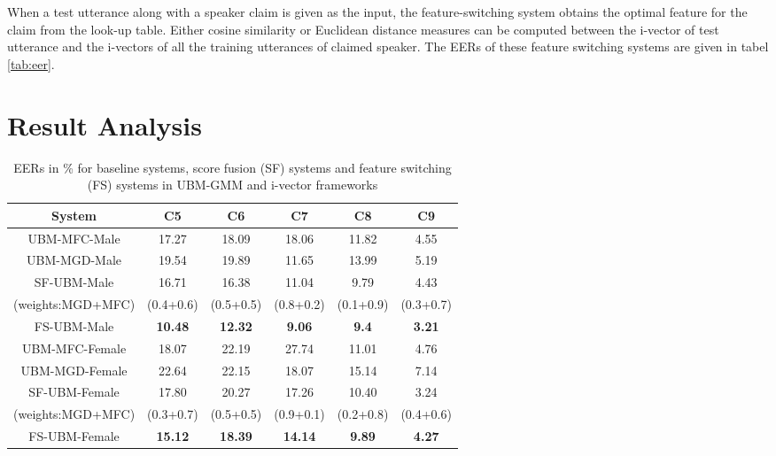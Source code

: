 \documentclass{article}
\begin{document}
\vspace{0.25 cm}
When a test utterance along with a speaker claim is given as the input, the feature-switching system obtains the optimal feature for the claim from the look-up table. Either cosine similarity or Euclidean distance measures can be computed between the i-vector of test utterance and the i-vectors of all the training utterances of claimed speaker. The EERs of these feature switching systems are given in tabel \ref{tab:eer}.

\section{Result Analysis}
\label{sec:resAnalysis}

\begin{table}[h]
	\centering
	\caption{EERs in \% for baseline systems, score fusion (SF) systems and feature switching (FS) systems in UBM-GMM and i-vector frameworks}
	\begin{tabular}{|c|c|c|c|c|c|} \hline
 {\bf System} & {\bf C5 } &  {\bf C6} & {\bf C7} & {\bf C8}  & {\bf C9  }\\ \hline \hline

UBM-MFC-Male & 17.27 & 18.09 & 18.06 & 11.82 & 4.55 \\ \hline

UBM-MGD-Male & 19.54 & 19.89 & 11.65 & 13.99 & 5.19 \\ \hline

SF-UBM-Male & 16.71 & 16.38 & 11.04 & 9.79 & 4.43 \\ 
(weights:MGD+MFC) & (0.4+0.6) & (0.5+0.5) & (0.8+0.2) & (0.1+0.9) & (0.3+0.7) \\ \hline

{FS-UBM-Male} & {\bf 10.48} & {\bf 12.32} & {\bf 9.06} & {\bf 9.4} & {\bf 3.21} \\  \hline

{UBM-MFC-Female} & 18.07 & 22.19 & 27.74 & 11.01 & 4.76 \\ \hline

{UBM-MGD-Female} & 22.64 & 22.15 & 18.07 & 15.14 & 7.14 \\ \hline

SF-UBM-Female & 17.80 & 20.27 & 17.26 & 10.40 & 3.24 \\ 
(weights:MGD+MFC) & (0.3+0.7) & (0.5+0.5) & (0.9+0.1) & (0.2+0.8) & (0.4+0.6) \\ \hline

{FS-UBM-Female} & {\bf 15.12 } & {\bf 18.39} & {\bf 14.14} & {\bf 9.89} & {\bf 4.27} \\ \hline


\end{tabular}
\end{table}
\end{document}
